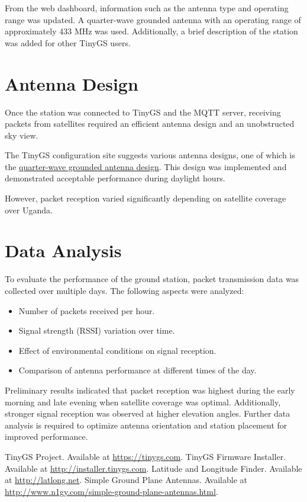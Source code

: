 \documentclass{article}
\begin{document}
From the web dashboard, information such as the antenna type and operating range was updated. A quarter-wave grounded antenna with an operating range of approximately 433 MHz was used. Additionally, a brief description of the station was added for other TinyGS users.

\section{Antenna Design}
Once the station was connected to TinyGS and the MQTT server, receiving packets from satellites required an efficient antenna design and an unobstructed sky view.

The TinyGS configuration site suggests various antenna designs, one of which is the \href{http://www.n1gy.com/simple-ground-plane-antennas.html}{quarter-wave grounded antenna design}. This design was implemented and demonstrated acceptable performance during daylight hours.

However, packet reception varied significantly depending on satellite coverage over Uganda.

\section{Data Analysis}
To evaluate the performance of the ground station, packet transmission data was collected over multiple days. The following aspects were analyzed:
\begin{itemize}
    \item Number of packets received per hour.
    \item Signal strength (RSSI) variation over time.
    \item Effect of environmental conditions on signal reception.
    \item Comparison of antenna performance at different times of the day.
\end{itemize}

Preliminary results indicated that packet reception was highest during the early morning and late evening when satellite coverage was optimal. Additionally, stronger signal reception was observed at higher elevation angles. Further data analysis is required to optimize antenna orientation and station placement for improved performance.


\begin{thebibliography}{1}
     TinyGS Project. Available at \url{https://tinygs.com}.
     TinyGS Firmware Installer. Available at \url{http://installer.tinygs.com}.
     Latitude and Longitude Finder. Available at \url{http://latlong.net}.
     Simple Ground Plane Antennas. Available at \url{http://www.n1gy.com/simple-ground-plane-antennas.html}.
\end{thebibliography}
\end{document}
